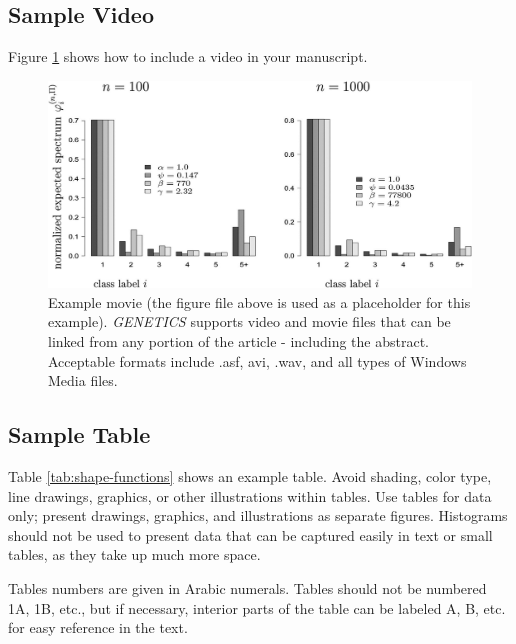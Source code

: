 \documentclass[9pt,twocolumn,twoside]{gsajnl}
\begin{document}
\subsection*{Sample Video}

Figure \ref{video:spectrum} shows how to include a video in your manuscript.

\begin{figure}[htbp]
\centering
\includegraphics[width=\linewidth]{example-figure}
\caption{Example movie (the figure file above is used as a placeholder for this example). \textit{GENETICS} supports video and movie files that can be linked from any portion of the article - including the abstract. Acceptable formats include .asf, avi, .wav, and all types of Windows Media files.   
}%
\label{video:spectrum}
\end{figure}


\subsection*{Sample Table}

Table \ref{tab:shape-functions} shows an example table. Avoid shading, color type, line drawings, graphics, or other illustrations within tables. Use tables for data only; present drawings, graphics, and illustrations as separate figures. Histograms should not be used to present data that can be captured easily in text or small tables, as they take up much more space.  

Tables numbers are given in Arabic numerals. Tables should not be numbered 1A, 1B, etc., but if necessary, interior parts of the table can be labeled A, B, etc. for easy reference in the text.  
\end{document}
